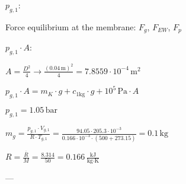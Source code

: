 \( p_{g,1} \):  

Force equilibrium at the membrane:  
\( F_g \), \( F_{EW} \), \( F_{p} \)  

\( p_{g,1} \cdot A \):  

\( A = \frac{D^2}{4} \rightarrow \frac{(0.04 \, \text{m})^2}{4} = 7.8559 \cdot 10^{-4} \, \text{m}^2 \)  

\( p_{g,1} \cdot A = m_K \cdot g + c_{1 \text{kg}} \cdot g + 10^5 \, \text{Pa} \cdot A \)  

\( p_{g,1} = 1.05 \, \text{bar} \)  

\( m_g = \frac{p_{g,1} \cdot V_{g,1}}{R \cdot T_{g,1}} = \frac{94.05 \cdot 205.3 \cdot 10^{-3}}{0.166 \cdot 10^{-3} \cdot (500 + 273.15)} = 0.1 \, \text{kg} \)  

\( R = \frac{\overline{R}}{M} = \frac{8.314}{50} = 0.166 \, \frac{\text{kJ}}{\text{kg·K}} \)  

---